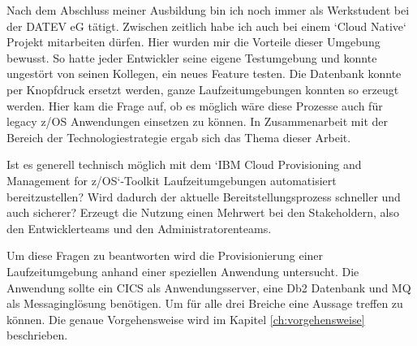 Nach dem Abschluss meiner Ausbildung bin ich noch immer als Werkstudent bei der DATEV eG tätigt.
Zwischen zeitlich habe ich auch bei einem `Cloud Native` Projekt mitarbeiten dürfen.
Hier wurden mir die Vorteile dieser Umgebung bewusst.
So hatte jeder Entwickler seine eigene Testumgebung und konnte ungestört von seinen Kollegen, ein neues Feature testen.
Die Datenbank konnte per Knopfdruck ersetzt werden, ganze Laufzeitumgebungen konnten so erzeugt werden.
Hier kam die Frage auf, ob es möglich wäre diese Prozesse auch für legacy z/OS Anwendungen einsetzen zu können.
In Zusammenarbeit mit der Bereich der Technologiestrategie ergab sich das Thema dieser Arbeit.

Ist es generell technisch möglich mit dem `IBM Cloud Provisioning and Management for z/OS`-Toolkit Laufzeitumgebungen automatisiert bereitzustellen?
Wird dadurch der aktuelle Bereitstellungsprozess schneller und auch sicherer?
Erzeugt die Nutzung einen Mehrwert bei den Stakeholdern, also den Entwicklerteams und den Administratorenteams.

Um diese Fragen zu beantworten wird die Provisionierung einer Laufzeitumgebung anhand einer speziellen Anwendung untersucht.
Die Anwendung sollte ein CICS als Anwendungsserver, eine Db2 Datenbank und MQ als Messaginglösung benötigen.
Um für alle drei Breiche eine Aussage treffen zu können.
Die genaue Vorgehensweise wird im Kapitel \ref{ch:vorgehensweise} beschrieben.